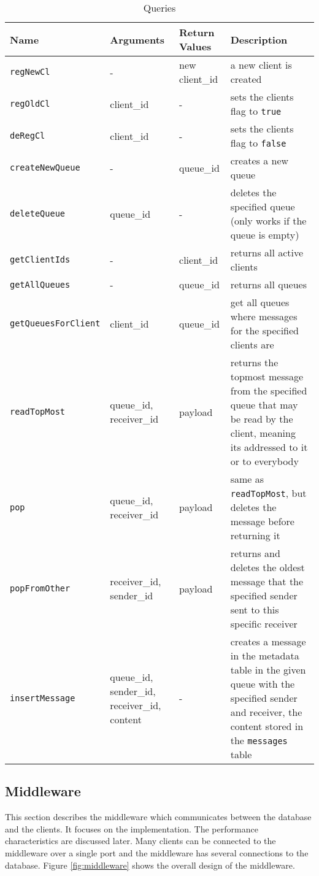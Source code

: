 \documentclass[
10pt, %
a4paper, %
oneside, %
headinclude,footinclude, %
BCOR5mm, %
]{scrartcl}
\begin{document}
\begin{table}[H]
\begin{adjustwidth}{-2in}{-2in}
\caption{Queries}
\centering
\begin{tabular}{|l|p{2cm}|p{2cm}|p{8cm}|}
\toprule
Name & Arguments &Return Values& Description\\
\midrule
\texttt{regNewCl} & -&new client\_id&a new client is created\\
\midrule
\texttt{regOldCl} & client\_id&-&sets the clients flag to \texttt{true}\\
\midrule
\texttt{deRegCl}&client\_id&-&sets the clients flag to \texttt{false}\\
\midrule
\texttt{createNewQueue}&-&queue\_id&creates a new queue\\
\midrule
\texttt{deleteQueue}&queue\_id&-&deletes the specified queue (only works if the queue is empty)\\
\midrule
\texttt{getClientIds}&-&client\_id&returns all active clients\\
\midrule
\texttt{getAllQueues}&-&queue\_id&returns all queues\\
\midrule
\texttt{getQueuesForClient}&\raggedright client\_id&queue\_id&get all queues where messages for the specified clients are\\
\midrule
\texttt{readTopMost}&\raggedright queue\_id, receiver\_id&payload&returns the topmost message from the specified queue that may be read by the client, meaning its addressed to it or to everybody\\
\midrule
\texttt{pop}&\raggedright queue\_id, receiver\_id&payload&same as \texttt{readTopMost}, but deletes the message before returning it\\
\midrule
\texttt{popFromOther}&\raggedright receiver\_id, sender\_id&payload&returns and deletes the oldest message that the specified sender sent to this specific receiver\\
\midrule
\texttt{insertMessage} & \raggedright queue\_id, sender\_id, receiver\_id, content & - &creates a message in the metadata table in the given queue with the specified sender and receiver, the content stored in the \texttt{messages} table \\
\bottomrule
\end{tabular}
\label{tab:queries}
\end{adjustwidth}

\end{table}



\subsection{Middleware}
This section describes the middleware which communicates between the database and the clients. It focuses on the implementation. The performance characteristics are discussed later. Many clients can be connected to the middleware over a single port and the middleware has several connections to the database. Figure \vref{fig:middleware} shows the overall design of the middleware. 
\end{document}
